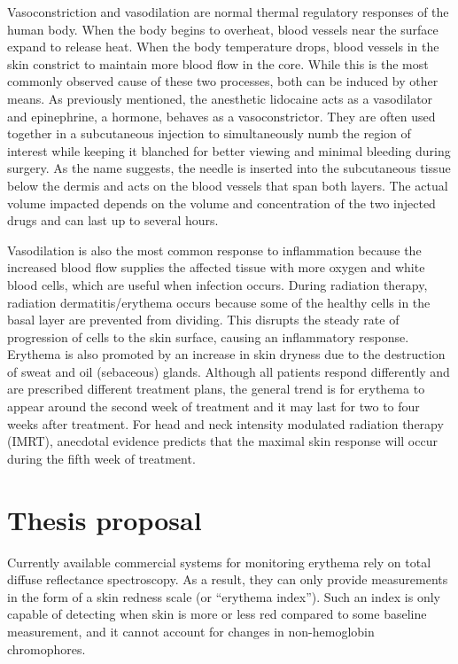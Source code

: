 Vasoconstriction and vasodilation are normal thermal regulatory responses of the human body.\cite{Kellogg2012} When the body begins to overheat, blood vessels near the surface expand to release heat. When the body temperature drops, blood vessels in the skin constrict to maintain more blood flow in the core. While this is the most commonly observed cause of these two processes, both can be induced by other means. As previously mentioned, the anesthetic lidocaine acts as a vasodilator and epinephrine, a hormone, behaves as a vasoconstrictor. They are often used together in a subcutaneous injection to simultaneously numb the region of interest while keeping it blanched for better viewing and minimal bleeding during surgery. As the name suggests, the needle is inserted into the subcutaneous tissue below the dermis and acts on the blood vessels that span both layers. The actual volume impacted depends on the volume and concentration of the two injected drugs and can last up to several hours.

Vasodilation is also the most common response to inflammation because the increased blood flow supplies the affected tissue with more oxygen and white blood cells, which are useful when infection occurs. During radiation therapy, radiation dermatitis/erythema occurs because some of the healthy cells in the basal layer are prevented from dividing.\cite{Fitzgerald2008} This disrupts the steady rate of progression of cells to the skin surface, causing an inflammatory response.\cite{Simonen1998} Erythema is also promoted by an increase in skin dryness due to the destruction of sweat and oil (sebaceous) glands. Although all patients respond differently and are prescribed different treatment plans, the general trend is for erythema to appear around the second week of treatment and it may last for two to four weeks after treatment. For head and neck intensity modulated radiation therapy (IMRT), anecdotal evidence predicts that the maximal skin response will occur during the fifth week of treatment.

\section{Thesis proposal}
Currently available commercial systems for monitoring erythema rely on total diffuse reflectance spectroscopy.\cite{Clarys2000} As a result, they can only provide measurements in the form of a skin redness scale (or ``erythema index''). Such an index is only capable of detecting when skin is more or less red compared to some baseline measurement, and it cannot account for changes in non-hemoglobin chromophores.

